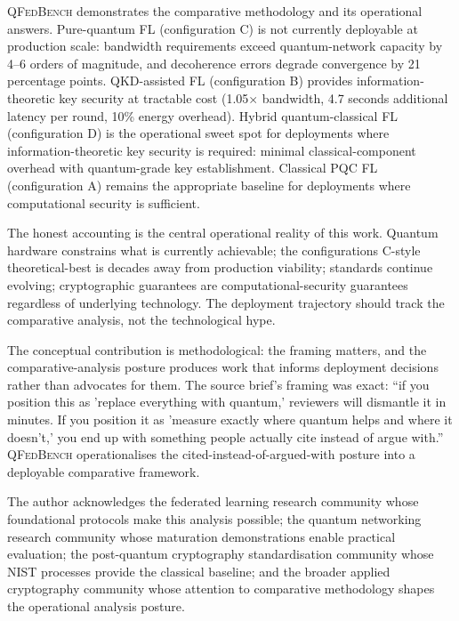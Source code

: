 \documentclass[sigconf,nonacm]{acmart}
\begin{document}
\textsc{QFedBench} demonstrates the comparative methodology and
its operational answers. Pure-quantum FL (configuration C) is not
currently deployable at production scale: bandwidth requirements
exceed quantum-network capacity by 4--6 orders of magnitude, and
decoherence errors degrade convergence by 21 percentage points.
QKD-assisted FL (configuration B) provides information-theoretic
key security at tractable cost (1.05$\times$ bandwidth, 4.7
seconds additional latency per round, 10\% energy overhead).
Hybrid quantum-classical FL (configuration D) is the operational
sweet spot for deployments where information-theoretic key
security is required: minimal classical-component overhead with
quantum-grade key establishment. Classical PQC FL (configuration
A) remains the appropriate baseline for deployments where
computational security is sufficient.

The honest accounting is the central operational reality of this
work. Quantum hardware constrains what is currently achievable;
the configurations C-style theoretical-best is decades away from
production viability; standards continue evolving; cryptographic
guarantees are computational-security guarantees regardless of
underlying technology. The deployment trajectory should track
the comparative analysis, not the technological hype.

The conceptual contribution is methodological: the framing
matters, and the comparative-analysis posture produces work that
informs deployment decisions rather than advocates for them. The
source brief's framing was exact: ``if you position this as
'replace everything with quantum,' reviewers will dismantle it
in minutes. If you position it as 'measure exactly where quantum
helps and where it doesn't,' you end up with something people
actually cite instead of argue with.'' \textsc{QFedBench}
operationalises the cited-instead-of-argued-with posture into a
deployable comparative framework.

\begin{acks}
The author acknowledges the federated learning research community
whose foundational protocols make this analysis possible; the
quantum networking research community whose maturation
demonstrations enable practical evaluation; the post-quantum
cryptography standardisation community whose NIST processes
provide the classical baseline; and the broader applied cryptography
community whose attention to comparative methodology shapes the
operational analysis posture.
\end{acks}
\end{document}
